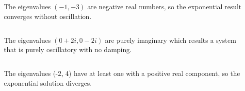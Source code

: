 \documentclass[11pt]{article}
\begin{document}
\section{}

\subsection{}  %
The eigenvalues $(-1, -3)$ are negative real numbers, so the exponential result converges without oscillation.

\subsection{}  %
The eigenvalues $(0+2i, 0-2i)$ are purely imaginary which results a system that is purely oscillatory with no damping.

\subsection{}  %
The eigenvalues (-2, 4) have at least one with a positive real component, so the exponential solution diverges.
\end{document}
